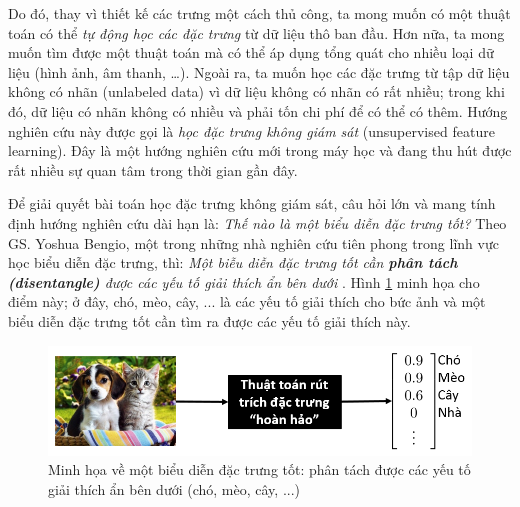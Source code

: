 Do đó, thay vì thiết kế các trưng một cách thủ công, ta mong muốn có một thuật toán có thể \emph{tự động học các đặc trưng} từ dữ liệu thô ban đầu. Hơn nữa, ta mong muốn tìm được một thuật toán mà có thể áp dụng tổng quát cho nhiều loại dữ liệu (hình ảnh, âm thanh, …). Ngoài ra, ta muốn học các đặc trưng từ tập dữ liệu không có nhãn (unlabeled data) vì dữ liệu không có nhãn có rất nhiều; trong khi đó, dữ liệu có nhãn không có nhiều và phải tốn chi phí để có thể có thêm. Hướng nghiên cứu này được gọi là \emph{học đặc trưng không giám sát} (unsupervised feature learning). Đây là một hướng nghiên cứu mới trong máy học và đang thu hút được rất nhiều sự quan tâm trong thời gian gần đây.

Để giải quyết bài toán học đặc trưng không giám sát, câu hỏi lớn và mang tính định hướng nghiên cứu dài hạn là: \emph{Thế nào là một biểu diễn đặc trưng tốt?} Theo GS. Yoshua Bengio, một trong những nhà nghiên cứu tiên phong trong lĩnh vực học biểu diễn đặc trưng, thì: \emph{Một biễu diễn đặc trưng tốt cần \textbf{phân tách (disentangle)} được các yếu tố giải thích ẩn bên dưới} \cite{bengio2013representation}. Hình \ref{fig_disentangle} minh họa cho điểm này; ở đây, chó, mèo, cây, ... là các yếu tố giải thích cho bức ảnh và một biểu diễn đặc trưng tốt cần tìm ra được các yếu tố giải thích này. 

\begin{figure}
	\centering
	\includegraphics[width=\textwidth]{disentangle}
	\caption[Minh họa về một biểu diễn đặc trưng tốt]{Minh họa về một biểu diễn đặc trưng tốt: phân tách được các yếu tố giải thích ẩn bên dưới (chó, mèo, cây, ...)}
	\label{fig_disentangle}
\end{figure}

